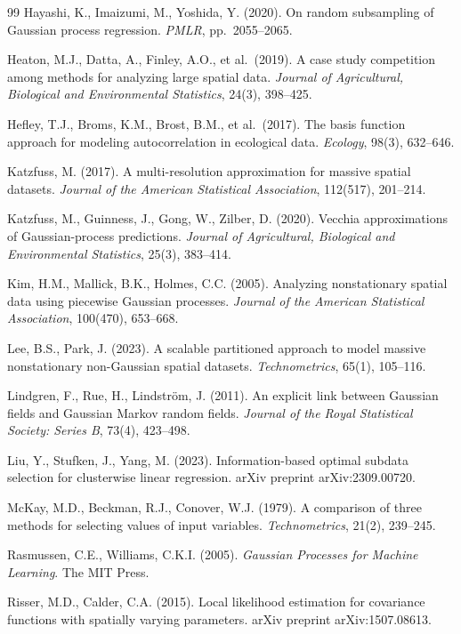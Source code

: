 \documentclass[12pt, a4paper]{article}
\begin{document}
\begin{thebibliography}{99}
Hayashi, K., Imaizumi, M., Yoshida, Y. (2020).
On random subsampling of Gaussian process regression.
\textit{PMLR}, pp.\ 2055--2065.

Heaton, M.J., Datta, A., Finley, A.O., et al.\ (2019).
A case study competition among methods for analyzing large spatial data.
\textit{Journal of Agricultural, Biological and Environmental Statistics},
24(3), 398--425.

Hefley, T.J., Broms, K.M., Brost, B.M., et al.\ (2017).
The basis function approach for modeling autocorrelation in ecological data.
\textit{Ecology}, 98(3), 632--646.

Katzfuss, M. (2017).
A multi-resolution approximation for massive spatial datasets.
\textit{Journal of the American Statistical Association}, 112(517), 201--214.

Katzfuss, M., Guinness, J., Gong, W., Zilber, D. (2020).
Vecchia approximations of Gaussian-process predictions.
\textit{Journal of Agricultural, Biological and Environmental Statistics},
25(3), 383--414.

Kim, H.M., Mallick, B.K., Holmes, C.C. (2005).
Analyzing nonstationary spatial data using piecewise Gaussian processes.
\textit{Journal of the American Statistical Association}, 100(470), 653--668.

Lee, B.S., Park, J. (2023).
A scalable partitioned approach to model massive nonstationary non-Gaussian spatial datasets.
\textit{Technometrics}, 65(1), 105--116.

Lindgren, F., Rue, H., Lindström, J. (2011).
An explicit link between Gaussian fields and Gaussian Markov random fields.
\textit{Journal of the Royal Statistical Society: Series B}, 73(4), 423--498.

Liu, Y., Stufken, J., Yang, M. (2023).
Information-based optimal subdata selection for clusterwise linear regression.
arXiv preprint arXiv:2309.00720.

McKay, M.D., Beckman, R.J., Conover, W.J. (1979).
A comparison of three methods for selecting values of input variables.
\textit{Technometrics}, 21(2), 239--245.

Rasmussen, C.E., Williams, C.K.I. (2005).
\textit{Gaussian Processes for Machine Learning}.
The MIT Press.

Risser, M.D., Calder, C.A. (2015).
Local likelihood estimation for covariance functions with spatially varying parameters.
arXiv preprint arXiv:1507.08613.


\end{thebibliography}
\end{document}
